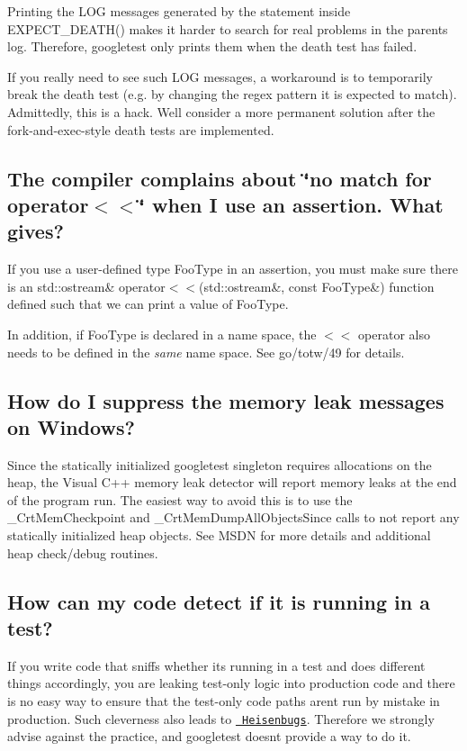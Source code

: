 Printing the L\+OG messages generated by the statement inside {\ttfamily E\+X\+P\+E\+C\+T\+\_\+\+D\+E\+A\+T\+H()} makes it harder to search for real problems in the parent\textquotesingle{}s log. Therefore, googletest only prints them when the death test has failed.

If you really need to see such L\+OG messages, a workaround is to temporarily break the death test (e.\+g. by changing the regex pattern it is expected to match). Admittedly, this is a hack. We\textquotesingle{}ll consider a more permanent solution after the fork-\/and-\/exec-\/style death tests are implemented.

\subsection*{The compiler complains about \char`\"{}no match for \textquotesingle{}operator$<$$<$\textquotesingle{}\char`\"{} when I use an assertion. What gives?}

If you use a user-\/defined type {\ttfamily Foo\+Type} in an assertion, you must make sure there is an {\ttfamily std\+::ostream\& operator$<$$<$(std\+::ostream\&, const Foo\+Type\&)} function defined such that we can print a value of {\ttfamily Foo\+Type}.

In addition, if {\ttfamily Foo\+Type} is declared in a name space, the {\ttfamily $<$$<$} operator also needs to be defined in the {\itshape same} name space. See go/totw/49 for details.

\subsection*{How do I suppress the memory leak messages on Windows?}

Since the statically initialized googletest singleton requires allocations on the heap, the Visual C++ memory leak detector will report memory leaks at the end of the program run. The easiest way to avoid this is to use the {\ttfamily \+\_\+\+Crt\+Mem\+Checkpoint} and {\ttfamily \+\_\+\+Crt\+Mem\+Dump\+All\+Objects\+Since} calls to not report any statically initialized heap objects. See M\+S\+DN for more details and additional heap check/debug routines.

\subsection*{How can my code detect if it is running in a test?}

If you write code that sniffs whether it\textquotesingle{}s running in a test and does different things accordingly, you are leaking test-\/only logic into production code and there is no easy way to ensure that the test-\/only code paths aren\textquotesingle{}t run by mistake in production. Such cleverness also leads to \href{https://en.wikipedia.org/wiki/Heisenbug}{\texttt{ Heisenbugs}}. Therefore we strongly advise against the practice, and googletest doesn\textquotesingle{}t provide a way to do it.

